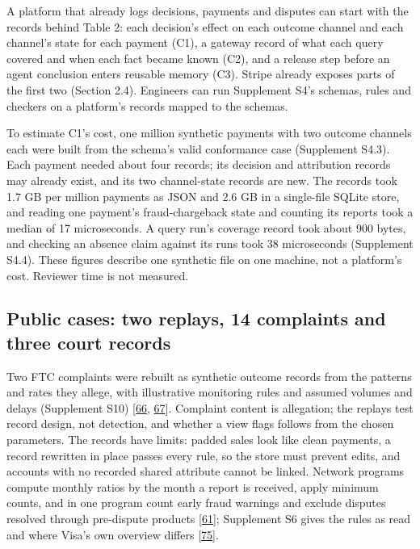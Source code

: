 \documentclass[acmlarge,review,anonymous,nonacm]{acmart}
\begin{document}
A platform that already logs decisions, payments and disputes can start
with the records behind Table 2: each decision's effect on each outcome
channel and each channel's state for each payment (C1), a gateway record
of what each query covered and when each fact became known (C2), and a
release step before an agent conclusion enters reusable memory (C3).
Stripe already exposes parts of the first two (Section 2.4). Engineers
can run Supplement S4's schemas, rules and checkers on a platform's
records mapped to the schemas.

To estimate C1's cost, one million synthetic payments with two outcome
channels each were built from the schema's valid conformance case
(Supplement S4.3). Each payment needed about four records; its decision
and attribution records may already exist, and its two channel-state
records are new. The records took 1.7 GB per million payments as JSON
and 2.6 GB in a single-file SQLite store, and reading one payment's
fraud-chargeback state and counting its reports took a median of 17
microseconds. A query run's coverage record took about 900 bytes, and
checking an absence claim against its runs took 38 microseconds
(Supplement S4.4). These figures describe one synthetic file on one
machine, not a platform's cost. Reviewer time is not measured.

\hypertarget{public-cases-two-replays-14-complaints-and-three-court-records}{%
\subsection{Public cases: two replays, 14 complaints and three court
records}\label{public-cases-two-replays-14-complaints-and-three-court-records}}

Two FTC complaints were rebuilt as synthetic outcome records from the
patterns and rates they allege, with illustrative monitoring rules and
assumed volumes and delays (Supplement S10)
{[}\protect\hyperlink{ref-FTC2020FirstData}{66},
\protect\hyperlink{ref-FTC2019Allied}{67}{]}. Complaint content is
allegation; the replays test record design, not detection, and whether a
view flags follows from the chosen parameters. The records have limits:
padded sales look like clean payments, a record rewritten in place
passes every rule, so the store must prevent edits, and accounts with no
recorded shared attribute cannot be linked. Network programs compute
monthly ratios by the month a report is received, apply minimum counts,
and in one program count early fraud warnings and exclude disputes
resolved through pre-dispute products
{[}\protect\hyperlink{ref-Stripe2026MonitoringPrograms}{61}{]};
Supplement S6 gives the rules as read and where Visa's own overview
differs {[}\protect\hyperlink{ref-Visa2025VAMP}{75}{]}.
\end{document}
